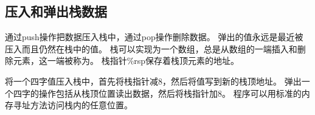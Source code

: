 {{        %
        \begin{practicec}

        \end{practicec}
    }

    \subsection{压入和弹出栈数据}
    {
        通过push操作把数据压入栈中，通过pop操作删除数据。
        弹出的值永远是最近被压入而且仍然在栈中的值。
        栈可以实现为一个数组，总是从数组的一端插入和删除元素，这一端被称为。
        栈指针\%rsp保存着栈顶元素的地址。

        将一个四字值压入栈中，首先将栈指针减8，然后将值写到新的栈顶地址。
        弹出一个四字的操作包括从栈顶位置读出数据，然后将栈指针加8。
        程序可以用标准的内存寻址方法访问栈内的任意位置。
    }
}
